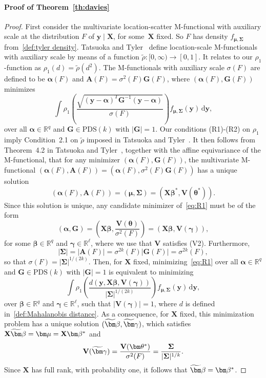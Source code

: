 \documentclass{article}
\numberwithin{equation}{section}
\theoremstyle{plain}
\newcommand{\R}{\mathbb{R}}
\newcommand{\dd}{\mathrm{d}}
\newcommand{\bbeta}{\bm\beta}
\newcommand{\btheta}{\bm\theta}
\newcommand{\balpha}{\bm\alpha}
\newcommand{\bgamma}{\bm\gamma}
\newcommand{\bmu}{\bm\mu}
\newcommand{\bSigma}{\mathbf{\Sigma}}
\newcommand{\by}{\mathbf{y}}
\newcommand{\bX}{\mathbf{X}}
\newcommand{\bV}{\mathbf{V}}
\newcommand{\bG}{\mathbf{G}}
\newcommand{\bA}{\mathbf{A}}
\begin{document}
\paragraph*{Proof of Theorem~\ref{th:davies}}
\begin{proof}
First consider the multivariate location-scatter M-functional with auxiliary scale at the distribution $F$ of $\by\mid\bX$, for some~$\bX$ fixed.
So $F$ has density $f_{\bmu,\bSigma}$ from~\eqref{def:tyler density}.
Tatsuoka and Tyler~\cite{tatsuoka&tyler2000} define location-scale M-functionals with auxiliary scale by means of a function
$\widetilde{\rho}:[0,\infty)\to[0,1]$.
It relates to our $\rho_1$-function as $\rho_1(d)=\widetilde{\rho}(d^2)$.
The M-functionals with auxiliary scale $\sigma(F)$ are defined 
to be $\balpha(F)$ and $\bA(F)=\sigma^2(F)\bG(F)$, where $(\balpha(F),\bG(F))$ minimizes
\begin{equation}
\label{eq:R1}
\int \rho_1
\left(
\frac{\displaystyle\sqrt{(\mathbf{y}-\balpha)^T\bG^{-1}(\mathbf{y}-\balpha)}}{\sigma(F)}
\right)
f_{\bmu,\bSigma}(\by)
\,\dd \mathbf{y},
\end{equation}
over all $\balpha\in\R^q$ and $\bG\in\text{PDS}(k)$ with $|\bG|=1$.
Our conditions (R1)-(R2) on $\rho_1$
imply Condition~2.1 on $\widetilde{\rho}$ imposed in Tatsuoka and Tyler~\cite{tatsuoka&tyler2000}.
It then follows from Theorem~4.2 in Tatsuoka and Tyler~\cite{tatsuoka&tyler2000}, together with the affine equivariance of the M-functional,
that
for any minimizer $(\balpha(F),\bG(F))$,
the multivariate M-functional $(\balpha(F),\bA(F))=(\balpha(F),\sigma^2(F)\bG(F))$ has a unique
solution 
\[
(\balpha(F),\bA(F))=(\bmu,\bSigma)=(\bX\bbeta^*,\bV(\btheta^*)).
\]
Since this solution is unique, any candidate minimizer of~\eqref{eq:R1} must
be of the form 
\[
(\balpha,\bG)
=
\left(
\bX\bbeta,\frac{\bV(\btheta)}{\sigma^2(F)}
\right)
=
\left(
\bX\bbeta,
\bV(\bgamma)
\right),
\]
for some $\bbeta\in\R^q$ and $\bgamma\in\R^\ell$,
where we use that $\bV$ satisfies (V2).
Furthermore, 
\[
|\bSigma|=|\bA(F)|=\sigma^{2k}(F)|\bG(F)|=\sigma^{2k}(F),
\]
so that $\sigma(F)=|\bSigma|^{1/(2k)}$.
Then, for $\bX$ fixed, minimizing~\eqref{eq:R1} over all $\balpha\in\R^q$ and  $\bG\in\text{PDS}(k)$ with $|\bG|=1$ is equivalent to 
minimizing 
\begin{equation}
\label{eq:R1 with X}
\int \rho_1
\left(
\frac{d(\by,\bX\bbeta,\bV(\bgamma))}{|\bSigma|^{1/(2k)}}
\right)
f_{\bmu,\bSigma}(\by)
\,\dd \mathbf{y},
\end{equation}
over $\bbeta\in\R^q$ and $\bgamma\in\R^\ell$, such that $|\bV(\bgamma)|=1$,
where $d$ is defined in~\eqref{def:Mahalanobis distance}.
As a consequence, for $\bX$ fixed, this minimization problem has a unique solution $(\widetilde\bbeta,\widetilde\bgamma)$,
which satisfies $\bX\widetilde\bbeta=\bmu=\bX\bbeta^*$ and 
\begin{equation}
\label{eq:prop Vgamma}
\bV(\widetilde\bgamma)
=
\frac{\bV(\btheta^*)}{\sigma^2(F)}
=
\frac{\bSigma}{|\bSigma|^{1/k}}.
\end{equation}
Since $\bX$ has full rank, with probability one, it follows that
$\widetilde\bbeta=\bbeta^*$.


\end{proof}
\end{document}
